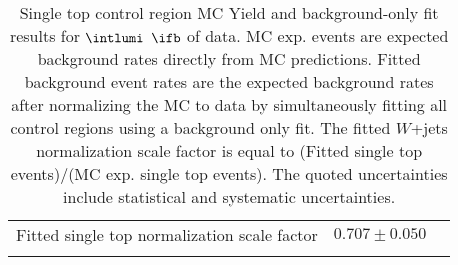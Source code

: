 \begin{table}[h!]
\begin{center}
{\begin{tabular*}{\textwidth}{@{\extracolsep{\fill}}lrr}
\noalign{\smallskip}\hline\noalign{\smallskip}
Fitted single top normalization scale factor & $0.707 \pm 0.050$ \\
\noalign{\smallskip}\hline\noalign{\smallskip}
\end{tabular*}
}
\end{center}
\caption[Single top control region MC Yield and background-only fit results for $\intlumi$ $\ifb$ of data]{Single top control region MC Yield and background-only fit results for $\intlumi$ $\ifb$ of data. MC exp. events are expected background rates directly from MC predictions.  Fitted background event rates are the expected background rates after normalizing the MC to data by simultaneously fitting all control regions using a background only fit.  The fitted $W$+jets normalization scale factor is equal to (Fitted single top events)/(MC exp. single top events). The quoted uncertainties include statistical and systematic uncertainties. }
\label{table.bkgonly.CRST}
\end{table}
%